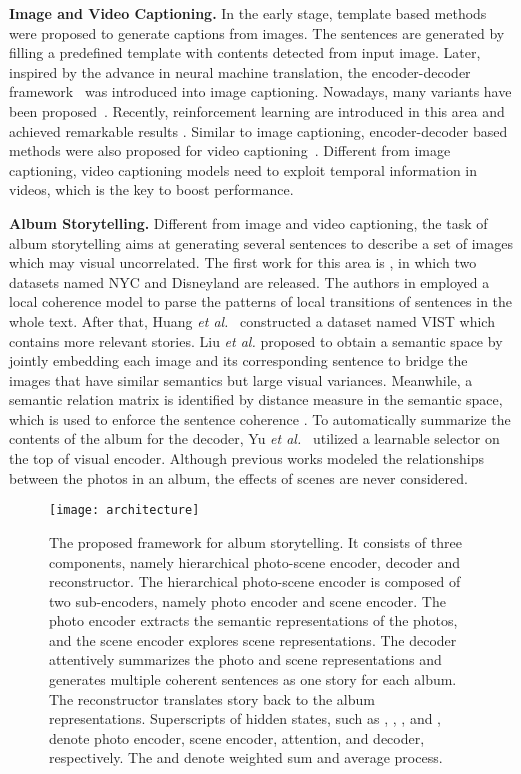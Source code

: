 \documentclass[letterpaper]{article} \usepackage{aaai19}  \usepackage{times}  \usepackage{helvet}  \usepackage{courier}  \usepackage{url}  \usepackage{graphicx}  \usepackage{color}
\begin{document}
\textbf{Image and Video Captioning.} In the early stage, template based methods were proposed to generate captions from images. The sentences are generated by filling a predefined template with contents detected from input image. Later, inspired by the advance in neural machine translation, the encoder-decoder framework~\cite{vinyals2015show} was introduced into image captioning. Nowadays, many variants have been proposed~\cite{xu2015show,he2016dual}.  Recently, reinforcement learning are introduced in this area and achieved remarkable results \cite{rennie2016self,ren2017deep}. Similar to image captioning, encoder-decoder based methods were also proposed for video captioning~\cite{venugopalan2015sequence,pan2016hierarchical}. Different from image captioning, video captioning models need to exploit temporal information in videos, which is the key to boost performance.








\textbf{Album Storytelling.} Different from image and video captioning, the task of album storytelling aims at generating several sentences to describe a set of images which may visual uncorrelated. The first work for this area is \cite{park2015expressing}, in which two datasets named NYC and Disneyland are released. The authors in \cite{park2015expressing} employed a local coherence model \cite{barzilay2008modeling} to parse the patterns of local transitions of sentences in the whole text. After that, Huang \textit{et al.}~\cite{huang2016visual} constructed a dataset named VIST which contains more relevant stories. Liu \textit{et al.} proposed to obtain a semantic space by jointly embedding each image and its corresponding sentence to bridge the images that have similar semantics but large visual variances. Meanwhile, a semantic relation matrix is identified by distance measure in the semantic space, which is used to enforce the sentence coherence \cite{liu2017let}. To automatically summarize the contents of the album for the decoder, Yu \textit{et al.}~\cite{yu2017hierarchically} utilized a learnable selector on the top of visual encoder. Although previous works modeled the relationships between the photos in an album, the effects of scenes are never considered.


\begin{figure*}
\centering
\texttt{[image: architecture]}
\caption{The proposed framework for album storytelling. It consists of three components, namely hierarchical photo-scene encoder, decoder and reconstructor. The hierarchical photo-scene encoder is composed of two sub-encoders, namely photo encoder and scene encoder. The  photo encoder extracts the semantic representations of the photos, and the scene encoder explores scene representations.
The decoder attentively summarizes the photo and scene representations and generates multiple coherent sentences as one story for each album. The reconstructor translates story back to the album representations.
Superscripts of hidden states, such as , , , and , denote photo encoder, scene encoder, attention, and decoder, respectively.
The  and  denote weighted sum and average process.}
\label{fig:architecture}
\end{figure*}
\end{document}
